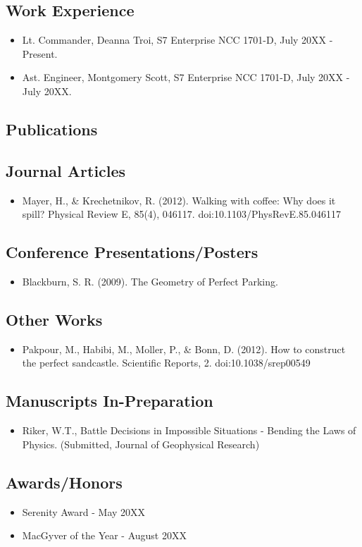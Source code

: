 \subsection{Work Experience}
\begin{itemize}
\item Lt. Commander, Deanna Troi, S7 Enterprise NCC 1701-D, July 20XX - Present.
\item Ast. Engineer, Montgomery Scott, S7 Enterprise NCC 1701-D, July 20XX - July 20XX.
\end{itemize}

\subsection{Publications}

\subsection*{Journal Articles}
\begin{itemize}
\item Mayer, H., \& Krechetnikov, R. (2012). Walking with coffee: Why does it spill? Physical Review E, 85(4), 046117. doi:10.1103/PhysRevE.85.046117
\end{itemize}

\subsection*{Conference Presentations/Posters}
\begin{itemize}
\item Blackburn, S. R. (2009). The Geometry of Perfect Parking.
\end{itemize}

\subsection*{Other Works}
\begin{itemize}
\item  Pakpour, M., Habibi, M., Moller, P., \& Bonn, D. (2012). How to construct the perfect sandcastle. Scientific Reports, 2. doi:10.1038/srep00549
\end{itemize}

\subsection*{Manuscripts In-Preparation}
\begin{itemize}
\item Riker, W.T., Battle Decisions in Impossible Situations - Bending the Laws of Physics. (Submitted, Journal of Geophysical Research)
\end{itemize}

\subsection*{Awards/Honors}
\begin{itemize}
\item Serenity Award - May 20XX
\item MacGyver of the Year - August 20XX
\end{itemize}
